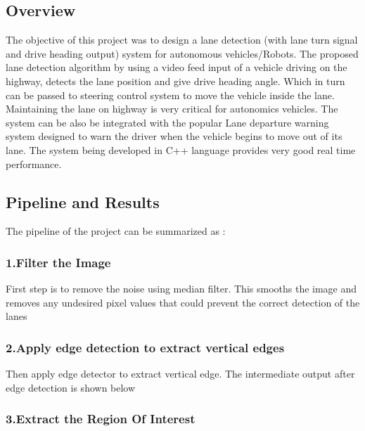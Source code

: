 \href{https://travis-ci.org/Indushekhar/AcmeLaneDetectionModule}{\tt } \href{https://coveralls.io/github/Indushekhar/AcmeLaneDetectionModule}{\tt } \href{https://opensource.org/licenses/MIT}{\tt }



 \subsection*{Overview}

The objective of this project was to design a lane detection (with lane turn signal and drive heading output) system for autonomous vehicles/\+Robots. The proposed lane detection algorithm by using a video feed input of a vehicle driving on the highway, detects the lane position and give drive heading angle. Which in turn can be passed to steering control system to move the vehicle inside the lane. Maintaining the lane on highway is very critical for autonomics vehicles. The system can be also be integrated with the popular Lane departure warning system designed to warn the driver when the vehicle begins to move out of its lane. The system being developed in C++ language provides very good real time performance.



\subsection*{Pipeline and Results}

The pipeline of the project can be summarized as \+:

\subsubsection*{1.\+Filter the Image}

First step is to remove the noise using median filter. This smooths the image and removes any undesired pixel values that could prevent the correct detection of the lanes

\subsubsection*{2.\+Apply edge detection to extract vertical edges}

Then apply edge detector to extract vertical edge. The intermediate output after edge detection is shown below



\subsubsection*{3.\+Extract the Region Of Interest}

